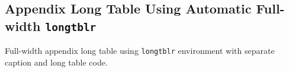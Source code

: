 \documentclass[phd]{ndsu-thesis-2022}
\begin{document}
\subsection{Appendix Long Table Using Automatic Full-width \texttt{longtblr}}

\kant[9]

\begin{appendixtable}%
\caption[Full-width appendix long table using \texttt{longtblr} environment with separate caption and long table code.]{Full-width appendix long table using \texttt{longtblr} environment with separate caption and long table code. \vspace{-5ex}}%
\label{aplongtab2}%
\end{appendixtable}
\end{document}
